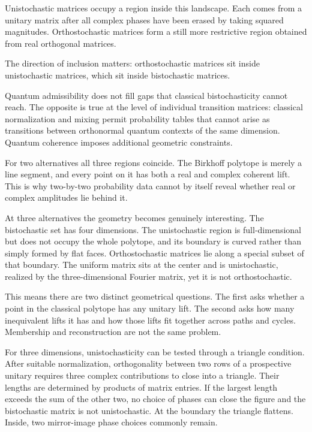 \documentclass[12pt,openany]{book}
\begin{document}
Unistochastic matrices occupy a region inside this landscape. Each comes from a unitary matrix after all complex phases have been erased by taking squared magnitudes. Orthostochastic matrices form a still more restrictive region obtained from real orthogonal matrices.

The direction of inclusion matters: orthostochastic matrices sit inside unistochastic matrices, which sit inside bistochastic matrices.

Quantum admissibility does not fill gaps that classical bistochasticity cannot reach. The opposite is true at the level of individual transition matrices: classical normalization and mixing permit probability tables that cannot arise as transitions between orthonormal quantum contexts of the same dimension. Quantum coherence imposes additional geometric constraints.

For two alternatives all three regions coincide. The Birkhoff polytope is merely a line segment, and every point on it has both a real and complex coherent lift. This is why two-by-two probability data cannot by itself reveal whether real or complex amplitudes lie behind it.

At three alternatives the geometry becomes genuinely interesting. The bistochastic set has four dimensions. The unistochastic region is full-dimensional but does not occupy the whole polytope, and its boundary is curved rather than simply formed by flat faces. Orthostochastic matrices lie along a special subset of that boundary. The uniform matrix sits at the center and is unistochastic, realized by the three-dimensional Fourier matrix, yet it is not orthostochastic.

This means there are two distinct geometrical questions. The first asks whether a point in the classical polytope has any unitary lift. The second asks how many inequivalent lifts it has and how those lifts fit together across paths and cycles. Membership and reconstruction are not the same problem.

For three dimensions, unistochasticity can be tested through a triangle condition. After suitable normalization, orthogonality between two rows of a prospective unitary requires three complex contributions to close into a triangle. Their lengths are determined by products of matrix entries. If the largest length exceeds the sum of the other two, no choice of phases can close the figure and the bistochastic matrix is not unistochastic. At the boundary the triangle flattens. Inside, two mirror-image phase choices commonly remain.
\end{document}
